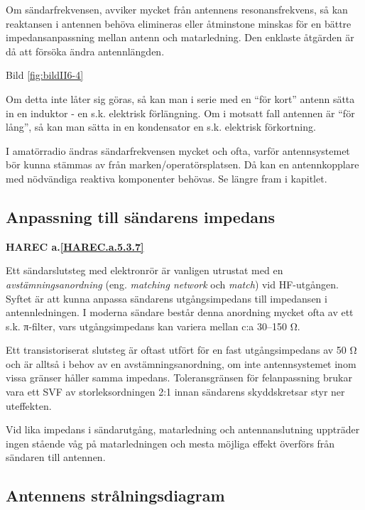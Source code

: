 Om sändarfrekvensen, avviker mycket från antennens resonansfrekvens,
så kan reaktansen i antennen behöva elimineras eller åtminstone
minskas för en bättre impedansanpassning mellan antenn och
matarledning. Den enklaste åtgärden är då att försöka ändra
antennlängden.

Bild \ref{fig:bildII6-4}

Om detta inte låter sig göras, så kan man i serie med en ``för kort''
antenn sätta in en induktor - en s.k. elektrisk förlängning. Om i
motsatt fall antennen är ``för lång'', så kan man sätta in en
kondensator en s.k. elektrisk förkortning.

I amatörradio ändras sändarfrekvensen mycket och ofta, varför
antennsystemet bör kunna stämmas av från marken/operatörsplatsen. Då
kan en antennkopplare med nödvändiga reaktiva komponenter behövas.  Se
längre fram i kapitlet.

\subsection{Anpassning till sändarens impedans}
\textbf{
HAREC a.\ref{HAREC.a.5.3.7}\label{myHAREC.a.5.3.7}
}

Ett sändarslutsteg med elektronrör är vanligen utrustat med en
\emph{avstämningsanordning} (eng. \emph{matching network} och \emph{match})
vid HF-utgången. Syftet är att kunna anpassa
sändarens utgångsimpedans till impedansen i antennledningen. I moderna
sändare består denna anordning mycket ofta av ett s.k. π-filter, vars
utgångsimpedans kan variera mellan c:a 30--150 Ω.

Ett transistoriserat slutsteg är oftast utfört för en fast
utgångsimpedans av 50 Ω och är alltså i behov av en
avstämningsanordning, om inte antennsystemet inom vissa gränser håller
samma impedans. Toleransgränsen för felanpassning brukar vara ett SVF
av storleksordningen 2:1 innan sändarens skyddskretsar styr ner
uteffekten.

Vid lika impedans i sändarutgång, matarledning och antennanslutning
uppträder ingen stående våg på matarledningen och mesta möjliga effekt
överförs från sändaren till antennen.

\subsection{Antennens strålningsdiagram}

